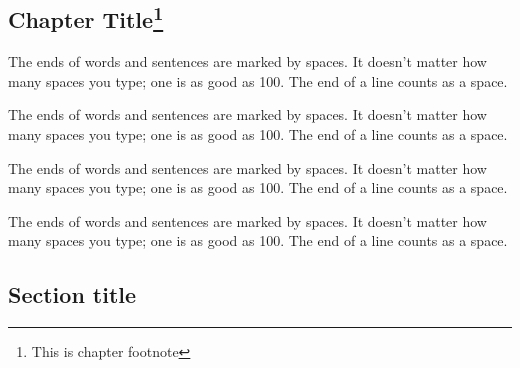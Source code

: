 \cleardoublepage

\begin{frontmatter}
\chapter{Chapter Title\footnote{This is chapter footnote}}\label{chap2}

\begin{aug}
\author[addressrefs={ad1,ad2}]%
  {   }%
\author[addressrefs={ad2}]%
 { }%
\address[id=ad1]%
  {Short Address}%
\address[id=ad2]%
  {Long Address}%
\end{aug}



%
\begin{chapterpoints}%
\item The ends of words and sentences are marked by spaces. It doesn't
  matter how many spaces you type; one is as good as 100.  The end of
  a line counts as a space.

\item The ends of words and sentences are marked by spaces. It doesn't
  matter how many spaces you type; one is as good as 100.  The end of
  a line counts as a space.
\end{chapterpoints}

\begin{dispquote}

  The ends of words and sentences are marked by spaces. It doesn't
  matter how many spaces you type; one is as good as 100.  The end of
  a line counts as a space.

  The ends of words and sentences are marked by spaces. It doesn't
  matter how many spaces you type; one is as good as 100.  The end of
  a line counts as a space.
  

\end{dispquote}

\end{frontmatter}


\section{Section title}\label{sec2.1}
